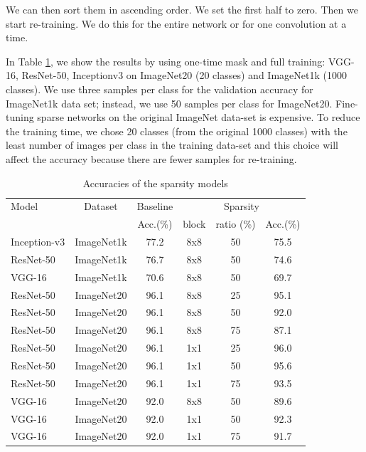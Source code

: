 \documentclass[conference]{IEEEtran}
\begin{document}
We can then sort them in ascending order. We set the first half to
zero.  Then we start re-training. We do this for the entire network or
for one convolution at a time.

In Table \ref{tab_acc}, we show the results by using one-time mask and
full training: VGG-16, ResNet-50, Inceptionv3 on ImageNet20 (20
classes) and ImageNet1k (1000 classes).  We use three samples per
class for the validation accuracy for ImageNet1k data set; instead, we
use 50 samples per class for ImageNet20. Fine-tuning sparse networks
on the original ImageNet data-set \cite{deng2009imagenet} is
expensive. To reduce the training time, we chose 20 classes (from the
original 1000 classes) with the least number of images per class in
the training data-set and this choice will affect the accuracy because
there are fewer samples for re-training.


\begin{table}[ht]
\caption{Accuracies of the sparsity models}
\label{tab_acc}
\begin{center} 
\scalebox{0.9}
{
\begin{tabular}{|l|c|c|c|c|c|}
\hline
\rule[-1ex]{0pt}{3.5ex}  Model & Dataset & Baseline  & \multicolumn{3}{c|}{Sparsity}\\
\rule[-1ex]{0pt}{3.5ex}  {} & {} & Acc.(\%) & block & ratio (\%) & Acc.(\%)    \\\hline\hline
\rule[-1ex]{0pt}{3.5ex}  Inception-v3 & ImageNet1k & 77.2 & 8x8 & 50 & 75.5  \\\hline
\rule[-1ex]{0pt}{3.5ex}  ResNet-50 & ImageNet1k & 76.7 & 8x8 & 50 & 74.6  \\\hline
\rule[-1ex]{0pt}{3.5ex}  VGG-16    & ImageNet1k & 70.6 & 8x8 & 50 & 69.7  \\\hline \hline
\rule[-1ex]{0pt}{3.5ex}  ResNet-50 & ImageNet20 & 96.1 & 8x8 & 25 & 95.1  \\\hline
\rule[-1ex]{0pt}{3.5ex}  ResNet-50 & ImageNet20 & 96.1 & 8x8 & 50 & 92.0  \\\hline
\rule[-1ex]{0pt}{3.5ex}  ResNet-50 & ImageNet20 & 96.1 & 8x8 & 75 & 87.1  \\\hline
\rule[-1ex]{0pt}{3.5ex}  ResNet-50 & ImageNet20 & 96.1 & 1x1 & 25 & 96.0  \\\hline
\rule[-1ex]{0pt}{3.5ex}  ResNet-50 & ImageNet20 & 96.1 & 1x1 & 50 & 95.6  \\\hline
\rule[-1ex]{0pt}{3.5ex}  ResNet-50 & ImageNet20 & 96.1 & 1x1 & 75 & 93.5  \\\hline
\rule[-1ex]{0pt}{3.5ex}  VGG-16    & ImageNet20 & 92.0 & 8x8 & 50 & 89.6  \\\hline
\rule[-1ex]{0pt}{3.5ex}  VGG-16    & ImageNet20 & 92.0 & 1x1 & 50 & 92.3  \\\hline
\rule[-1ex]{0pt}{3.5ex}  VGG-16    & ImageNet20 & 92.0 & 1x1 & 75 & 91.7  \\\hline
\end{tabular}\vspace{-20pt}
}
\end{center}
\end{table}
\end{document}
